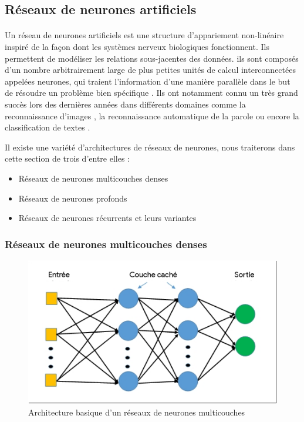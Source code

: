 	\subsection{Réseaux de neurones artificiels}
		\paragraph{}
		Un réseau de neurones artificiels est une structure d'appariement non-linéaire inspiré de la façon dont les systèmes nerveux biologiques fonctionnent. Ils permettent de modéliser les relations sous-jacentes des données. ils sont composés d'un nombre arbitrairement large de plus petites unités de calcul interconnectées appelées neurones, qui traient l'information d'une manière parallèle dans le but de résoudre un problème bien spécifique \cite{neural_nets}. Ils ont notamment connu un très grand succès lors des dernières années dans différents domaines comme la reconnaissance d'images \cite{inception}, la reconnaissance automatique de la parole \cite{speech_reco_dnn} \cite{speech_reco_Yu2015} ou encore la classification de textes \cite{seq2seq_multitask_classification} \cite{dnn_text_classification}.
		\par 
		Il existe une variété d'architectures de réseaux de neurones, nous traiterons dans cette section de trois d'entre elles : 
			\begin{itemize}
				\item Réseaux de neurones multicouches denses
				\item Réseaux de neurones profonds
				\item Réseaux de neurones récurrents et leurs variantes
			\end{itemize}
		\subsubsection{Réseaux de neurones multicouches denses}
		\begin{figure}[H]
			\centering
			\includegraphics[width=0.5\linewidth]{images/notions/mlp.png}
			\caption{Architecture basique d'un réseaux de neurones multicouches}
			\label{mlp}
		\end{figure}
